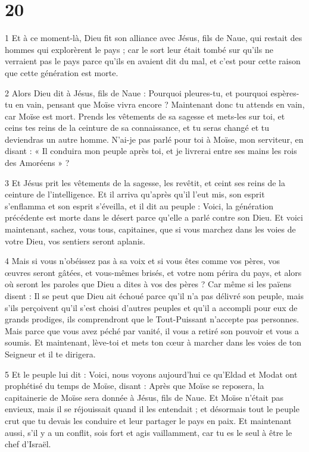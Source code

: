 \chapter{20}

\par 1 Et à ce moment-là, Dieu fit son alliance avec Jésus, fils de Naue, qui restait des hommes qui explorèrent le pays ; car le sort leur était tombé sur qu'ils ne verraient pas le pays parce qu'ils en avaient dit du mal, et c'est pour cette raison que cette génération est morte.

\par 2 Alors Dieu dit à Jésus, fils de Naue : Pourquoi pleures-tu, et pourquoi espères-tu en vain, pensant que Moïse vivra encore ? Maintenant donc tu attends en vain, car Moïse est mort. Prends les vêtements de sa sagesse et mets-les sur toi, et ceins tes reins de la ceinture de sa connaissance, et tu seras changé et tu deviendras un autre homme. N'ai-je pas parlé pour toi à Moïse, mon serviteur, en disant : « Il conduira mon peuple après toi, et je livrerai entre ses mains les rois des Amoréens » ?

\par 3 Et Jésus prit les vêtements de la sagesse, les revêtit, et ceint ses reins de la ceinture de l'intelligence. Et il arriva qu'après qu'il l'eut mis, son esprit s'enflamma et son esprit s'éveilla, et il dit au peuple : Voici, la génération précédente est morte dans le désert parce qu'elle a parlé contre son Dieu. Et voici maintenant, sachez, vous tous, capitaines, que si vous marchez dans les voies de votre Dieu, vos sentiers seront aplanis.

\par 4 Mais si vous n'obéissez pas à sa voix et si vous êtes comme vos pères, vos œuvres seront gâtées, et vous-mêmes brisés, et votre nom périra du pays, et alors où seront les paroles que Dieu a dites à vos des pères ? Car même si les païens disent : Il se peut que Dieu ait échoué parce qu'il n'a pas délivré son peuple, mais s'ils perçoivent qu'il s'est choisi d'autres peuples et qu'il a accompli pour eux de grands prodiges, ils comprendront que le Tout-Puissant n'accepte pas personnes. Mais parce que vous avez péché par vanité, il vous a retiré son pouvoir et vous a soumis. Et maintenant, lève-toi et mets ton cœur à marcher dans les voies de ton Seigneur et il te dirigera.

\par 5 Et le peuple lui dit : Voici, nous voyons aujourd'hui ce qu'Eldad et Modat ont prophétisé du temps de Moïse, disant : Après que Moïse se reposera, la capitainerie de Moïse sera donnée à Jésus, fils de Naue. Et Moïse n'était pas envieux, mais il se réjouissait quand il les entendait ; et désormais tout le peuple crut que tu devais les conduire et leur partager le pays en paix. Et maintenant aussi, s'il y a un conflit, sois fort et agis vaillamment, car tu es le seul à être le chef d'Israël.

